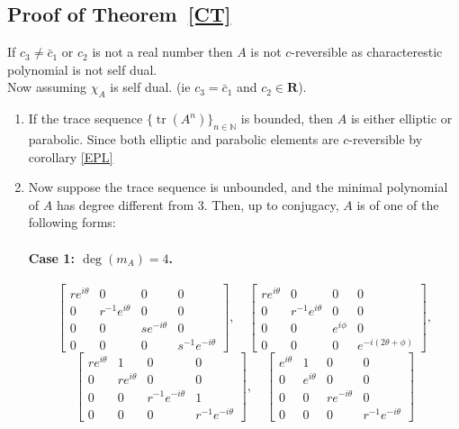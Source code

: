 \documentclass[11pt]{amsart}
\numberwithin{equation}{section}
\theoremstyle{plain}
\theoremstyle{definition}
\newcommand{\thmref}[1]{Theorem~\ref{#1}}
\numberwithin{equation}{section}
\begin{document}
	\subsection{Proof of \thmref{CT}}
    If $c_3\neq \bar{c}_1$ or $c_{2} $ is not a real number then $A$ is not $c$-reversible  as characterestic polynomial is not self dual.\\
    Now assuming $\chi_A$ is self dual. (ie $c_3= \bar{c}_1$ and $c_2 \in \mathbf{R}$).\\
    \begin{enumerate}
    \item 
    If the trace sequence \( \{\operatorname{tr}(A^n)\}_{n \in \mathbb{N}} \) is bounded, then \( A \) is either elliptic or parabolic. Since both elliptic and parabolic elements are \( c \)-reversible by corollary \ref{EPL} 
\item 
Now suppose the trace sequence is unbounded, and the minimal polynomial of \( A \) has degree different from 3. Then, up to conjugacy, \( A \) is of one of the following forms:

\paragraph{Case 1: \( \deg(m_A) = 4 \).}
\[
\begin{bmatrix}
re^{i\theta} & 0 & 0 & 0\\
0 & r^{-1}e^{i\theta} & 0 & 0\\
0 & 0 & se^{-i\theta} & 0\\
0 & 0 & 0 & s^{-1}e^{-i\theta}
\end{bmatrix}, \quad
\begin{bmatrix}
re^{i\theta} & 0 & 0 & 0\\
0 & r^{-1}e^{i\theta} & 0 & 0\\
0 & 0 & e^{i\phi} & 0\\
0 & 0 & 0 & e^{-i(2\theta + \phi)}
\end{bmatrix},
\]
\[
\begin{bmatrix}
re^{i\theta} & 1 & 0 & 0\\
0 & re^{i\theta} & 0 & 0\\
0 & 0 & r^{-1}e^{-i\theta} & 1\\
0 & 0 & 0 & r^{-1}e^{-i\theta}
\end{bmatrix}, \quad
\begin{bmatrix}
e^{i\theta} & 1 & 0 & 0\\
0 & e^{i\theta} & 0 & 0\\
0 & 0 & re^{-i\theta} & 0\\
0 & 0 & 0 & r^{-1}e^{-i\theta}
\end{bmatrix}
\]


\end{enumerate}
\end{document}
